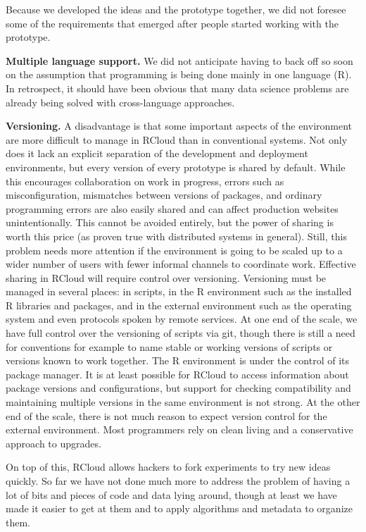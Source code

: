 Because we developed the ideas and the prototype together,
we did not foresee some of the requirements that emerged
after people started working with the prototype.

{\bf Multiple language support.}
We did not anticipate having to back off so soon on the
assumption that programming is being done mainly in one
language (R). In retrospect, it should have been obvious
that many data science problems are already being solved
with cross-language approaches.

{\bf Versioning.}
A disadvantage is that some important aspects of the environment
are more difficult to manage in RCloud than in conventional systems.
Not only does it lack an explicit separation of the development and
deployment environments, but every version of every prototype is
shared by default. While this encourages collaboration on work
in progress, errors such as misconfiguration, mismatches between
versions of packages, and ordinary programming errors are also
easily shared and can affect production websites unintentionally.
This cannot be avoided entirely, but the power of sharing is worth
this price (as proven true with distributed systems in general).
Still, this problem needs more attention if the environment is
going to be scaled up to a wider number of users with fewer
informal channels to coordinate work. Effective sharing in RCloud
will require control over versioning.
Versioning must be managed in several places: in scripts, in the R environment
such as the installed R libraries and packages, and in the external
environment such as the operating system and even protocols spoken by
remote services. At one end of the scale, we have full control over the
versioning of scripts via git, though there is still a need for conventions
for example to name stable or working versions of scripts or versions known
to work together. The R environment is under the control of its package
manager. It is at least possible for RCloud to access information about
package versions and configurations, but support for checking compatibility
and maintaining multiple versions in the same environment is not strong.
At the other end of the scale, there is not much reason to expect version
control for the external environment. Most programmers rely on clean living
and a conservative approach to upgrades.

On top of this, RCloud allows hackers to fork experiments to try
new ideas quickly. So far we have not done much more to address the
problem of having a lot of bits and pieces of code and data lying
around, though at least we have made it easier to get at them and
to apply algorithms and metadata to organize them.

